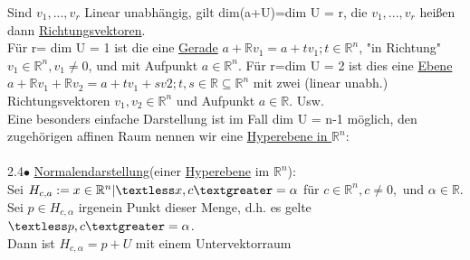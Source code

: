 \documentclass[]{scrartcl}
\begin{document}
Sind $v_1,...,v_r$ Linear unabhängig, gilt dim(a+U)=dim U = r, die 
$v_1,...,v_r$ heißen dann \ul{Richtungsvektoren}.\\
Für r= dim U = 1 ist die eine \ul{Gerade} $a + \mathbb{R}v_1 = {a+tv_1; 
t\in\mathbb{R}^n}$, "in Richtung" $v_1\in \mathbb{R}^n, v_1\neq 0$, und mit 
Aufpunkt $a \in \mathbb{R}^n$. Für r=dim U = 2  ist dies eine \ul{Ebene} $a + 
\mathbb{R}v_1 + \mathbb{R}v_2 = {a+tv_1+sv2; t,s \in 
\mathbb{R}}\subseteq\mathbb{R}^n$ mit zwei (linear unabh.) Richtungsvektoren 
$v_1,v_2\in \mathbb{R}^n$ und Aufpunkt $a\in \mathbb{R}$. Usw.\\
Eine besonders einfache Darstellung ist im Fall dim U = n-1 möglich, den 
zugehörigen affinen Raum nennen wir eine \ul{Hyperebene in $\mathbb{R}^n$}:\\
\\
2.4$\bullet$ \underline{Normalendarstellung}(einer \ul{Hyperebene} im 
$\mathbb{R}^n$):\\
Sei  $H_{c,a}:={x\in\mathbb{R}^n|\textless x,c\textgreater = 
\alpha}$ für $c \in \mathbb{R}^n, c\neq 0,$ und $\alpha \in \mathbb{R}.$\\
Sei $p\in H_{c,\alpha}$ irgenein Punkt dieser Menge, d.h. es gelte $\textless 
p,c \textgreater = \alpha$.\\
Dann ist $H_{c,\alpha} = p+U$ mit einem Untervektorraum  
\begin{abstract}
\section{}
\end{abstract}

\section{}
\end{document}
